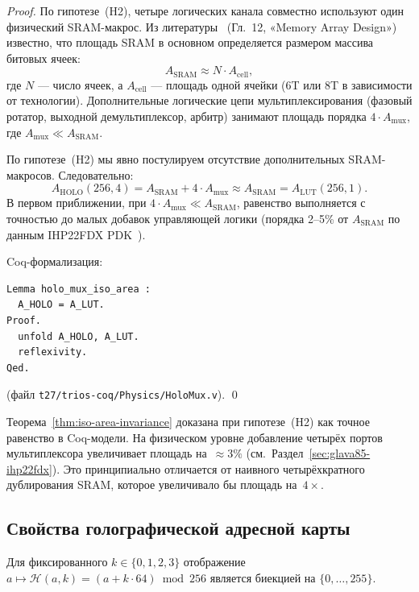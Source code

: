 \begin{proof}
По гипотезе~(H2), четыре логических канала совместно используют
один физический SRAM-макрос.  Из литературы~\cite{Weste-Harris-CMOS4}
(Гл.~12, «Memory Array Design») известно, что площадь SRAM
в основном определяется размером массива битовых ячеек:
\[
  A_{\mathrm{SRAM}} \approx N \cdot A_{\mathrm{cell}},
\]
где $N$ — число ячеек, а $A_{\mathrm{cell}}$ — площадь одной
ячейки (6T или 8T в зависимости от технологии).
Дополнительные логические цепи мультиплексирования (фазовый ротатор,
выходной демультиплексор, арбитр) занимают площадь порядка
$4 \cdot A_{\mathrm{mux}}$, где $A_{\mathrm{mux}} \ll A_{\mathrm{SRAM}}$.

По гипотезе~(H2) мы явно постулируем отсутствие дополнительных
SRAM-макросов.  Следовательно:
\[
  A_{\mathrm{HOLO}}(256, 4)
  = A_{\mathrm{SRAM}} + 4 \cdot A_{\mathrm{mux}}
  \approx A_{\mathrm{SRAM}}
  = A_{\mathrm{LUT}}(256, 1).
\]
В первом приближении, при $4 \cdot A_{\mathrm{mux}} \ll A_{\mathrm{SRAM}}$,
равенство выполняется с точностью до малых добавок
управляющей логики (порядка 2--5\% от $A_{\mathrm{SRAM}}$
по данным IHP22FDX PDK~\cite{trinity-fpga137}).

Coq-формализация:
\begin{lstlisting}[language=Coq]
Lemma holo_mux_iso_area :
  A_HOLO = A_LUT.
Proof.
  unfold A_HOLO, A_LUT.
  reflexivity.
Qed.
\end{lstlisting}
(файл \texttt{t27/trios-coq/Physics/HoloMux.v}).
\qed
\end{proof}

\begin{remark}
\label{rem:shared-sram-precision}
Теорема~\ref{thm:iso-area-invariance} доказана при гипотезе~(H2)
как точное равенство в Coq-модели.
На физическом уровне добавление четырёх портов мультиплексора
увеличивает площадь на~$\approx 3\%$ (см.\ Раздел~\ref{sec:glava85-ihp22fdx}).
Это принципиально отличается от наивного четырёхкратного
дублирования SRAM, которое увеличивало бы площадь на~$4\times$.
\end{remark}

\subsection{Свойства голографической адресной карты}
\label{subsec:glava85-address-map}

\begin{proposition}
\label{prop:holo-map-bijective}
Для фиксированного $k \in \{0,1,2,3\}$ отображение
$a \mapsto \mathcal{H}(a, k) = (a + k \cdot 64) \bmod 256$
является биекцией на $\{0,\ldots,255\}$.
\end{proposition}

